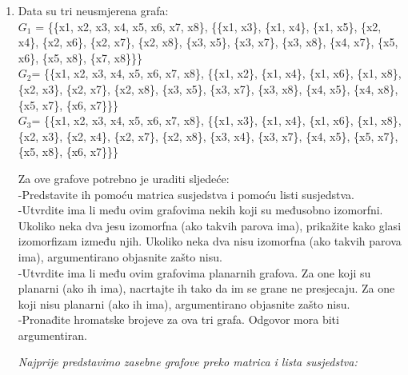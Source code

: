 \documentclass[12pt]{article}
\begin{document}
    
	\begin{enumerate}
	\item Data su tri neusmjerena grafa:\\
	\textbf{$G_1$} = \{\{x1, x2, x3, x4, x5, x6, x7, x8\}, \{\{x1, x3\}, \{x1, x4\}, \{x1, x5\}, \{x2, x4\}, \{x2, x6\}, \{x2, x7\}, \{x2, x8\}, \{x3, x5\}, \{x3, x7\}, \{x3, x8\}, \{x4, x7\}, \{x5, x6\}, \{x5, x8\}, \{x7, x8\}\}\}\\
\textbf{$G_2$}= \{\{x1, x2, x3, x4, x5, x6, x7, x8\}, \{\{x1, x2\}, \{x1, x4\}, \{x1, x6\}, \{x1, x8\}, \{x2, x3\}, \{x2, x7\}, \{x2, x8\}, \{x3, x5\}, \{x3, x7\}, \{x3, x8\}, \{x4, x5\}, \{x4, x8\}, \{x5, x7\}, \{x6, x7\}\}\}\\
\textbf{$G_3$}= \{\{x1, x2, x3, x4, x5, x6, x7, x8\}, \{\{x1, x3\}, \{x1, x4\}, \{x1, x6\}, \{x1, x8\}, \{x2, x3\}, \{x2, x4\}, \{x2, x7\}, \{x2, x8\}, \{x3, x4\}, \{x3, x7\}, \{x4, x5\}, \{x5, x7\}, \{x5, x8\}, \{x6, x7\}\}\}\\
\vspace{0.5cm}

Za ove grafove potrebno je uraditi sljedeće:\\
-Predstavite ih pomoću matrica susjedstva i pomoću listi susjedstva.\\
-Utvrdite ima li među ovim grafovima nekih koji su međusobno izomorfni. Ukoliko neka dva jesu izomorfna (ako takvih parova ima), prikažite kako glasi izomorfizam između njih. Ukoliko neka dva nisu izomorfna (ako takvih parova ima), argumentirano objasnite zašto nisu.\\
-Utvrdite ima li među ovim grafovima planarnih grafova. Za one koji su planarni (ako ih ima), nacrtajte ih tako da im se grane ne presjecaju. Za one koji nisu planarni (ako ih ima), argumentirano objasnite zašto nisu.\\
-Pronađite hromatske brojeve za ova tri grafa. Odgovor mora biti argumentiran.\\
\begin{center}
    \textit{Najprije predstavimo zasebne grafove preko matrica i lista susjedstva:}\\


\end{center}
\end{enumerate}
\end{document}
